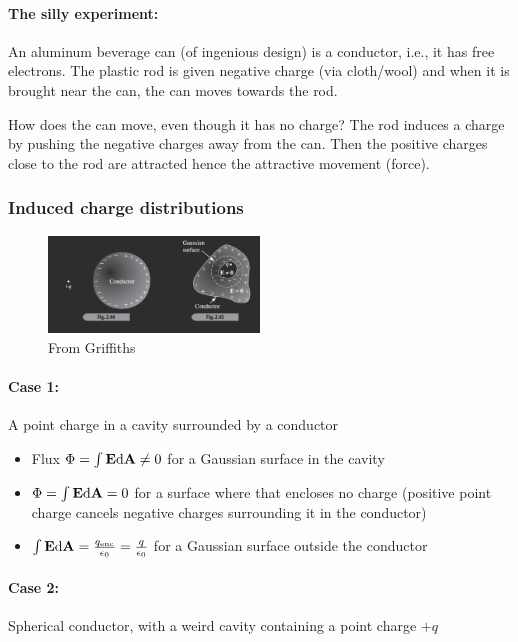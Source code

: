 \documentclass[../main.tex]{subfiles}
\begin{document}
\paragraph*{The silly experiment:} An aluminum beverage can (of ingenious design) is a conductor, i.e., it has free electrons.
The plastic rod is given negative charge (via cloth/wool) and when it is brought near the can, the can moves towards the rod.

How does the can move, even though it has no charge? The rod induces a charge by pushing the negative charges away from the can.
Then the positive charges close to the rod are attracted hence the attractive movement (force).

\subsubsection{Induced charge distributions}

\begin{figure}[ht]
    \centering
    \includegraphics[width=0.5\textwidth]{fig2_44.png}
    \caption{From Griffiths}
\end{figure}
\paragraph*{Case 1:} A point charge in a cavity surrounded by a conductor
\begin{itemize}
    \item Flux $\Phi = \int \vb E \dd\vb A \neq 0$ for a Gaussian surface in the cavity
    \item $\Phi = \int \vb E \dd\vb A = 0$ for a surface where that encloses no charge (positive point charge cancels negative charges surrounding it in the conductor)
    \item $\int \vb E \dd\vb A = \frac{q_{\textrm{enc}}}{\epsilon_0} = \frac{q}{\epsilon_0}$ for a Gaussian surface outside the conductor
\end{itemize}

\paragraph*{Case 2:} Spherical conductor, with a weird cavity containing a point charge $+q$
\end{document}
